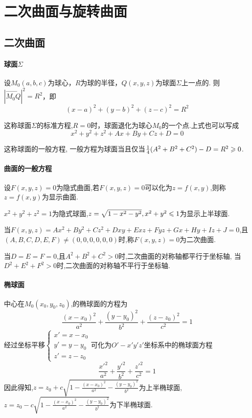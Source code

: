 \chapter{二次曲面与旋转曲面}

\section{二次曲面}

\subsubsection*{球面$\Sigma$}

设$M_0(a,b,c)$为球心，$R$为球的半径，$Q(x,y,z)$为球面$\Sigma$上一点的.
则$| \overrightarrow{M_0Q} |^2 = R^2$，即
$$
(x-a)^2 + (y-b)^2 + (z-c)^2 = R^2
$$

这称球面$\Sigma$的标准方程,$R =0$时，球面退化为球心$M_0$的一个点.上式也可以写成
$$
x^2 + y^2 + z^2 + Ax + By + Cz + D = 0
$$

这称球面的一般方程, 一般方程为球面当且仅当$\frac14(A^2 + B^2 + C^2)-D=R^2 \geqslant 0$.

\subsubsection*{曲面的一般方程}

设$F(x,y,z)=0$为隐式曲面,若$F(x,y,z) = 0$可以化为$z = f(x,y)$,则称$z= f(x,y)$为显示曲面.

\begin{example}
    $x^2+y^2+z^2=1$为隐式球面,$z = \sqrt{1-x^2-y^2},x^2+y^2 \leqslant 1$为显示上半球面.
\end{example}

当$F(x,y,z) = Ax^2 + By^2 + Cz^2 + Dxy + Exz + Fyz + Gx + Hy + Iz + J = 0$,且$(A,B,C,D,E,F) \neq (0,0,0,0,0,0)$时,称$F(x,y,z) = 0$为二次曲面.

当$D = E = F = 0$,且$A^2 + B^2 + C^2 >0$时,二次曲面的对称轴都平行于坐标轴,
当$D^2+E^2+F^2 > 0$时,二次曲面的对称轴不平行于坐标轴.

\subsubsection*{椭球面}

中心在$M_0(x_0,y_0,z_0)$,的椭球面的方程为
$$
\frac{(x-x_0)^2}{a^2} + \frac{(y-y_0)^2}{b^2} + \frac{(z-z_0)^2}{c^2} = 1
$$
经过坐标平移$\begin{cases}
x' = x - x_0\\
y' = y - y_0\\
z' = z - z_0
\end{cases}$可化为$O'-x'y'z'$坐标系中的椭球面方程
$$
\frac{x'^2}{a^2} + \frac{y'^2}{b^2} + \frac{z'^2}{c^2} = 1
$$
因此得知,$z = z_0 + c \sqrt{1 - \frac{(x-x_0)^2}{a^2} - \frac{(y-y_0)^2}{b^2}}$为上半椭球面,
$z = z_0 - c \sqrt{1 - \frac{(x-x_0)^2}{a^2} - \frac{(y-y_0)^2}{b^2}}$为下半椭球面.


